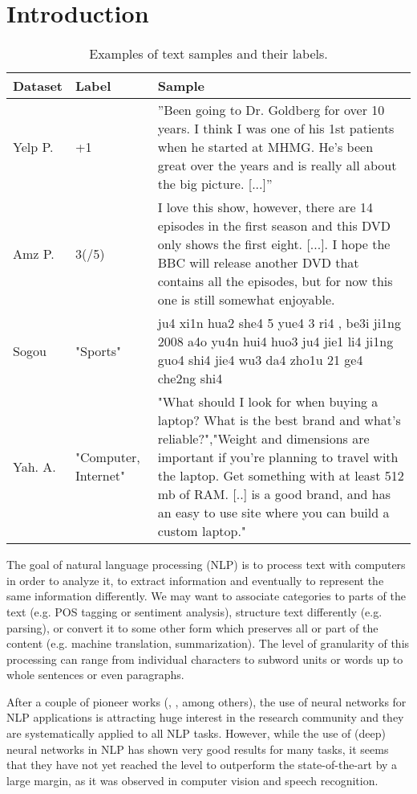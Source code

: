 \documentclass[a4paper,11pt]{article}
\newcommand{\eg}{e.g. }
\begin{document}
\section{Introduction}
\begin{table*}[!ht]
  \centering
  \begin{tabular}{|lp{1.4cm}p{12cm}|}
    \hline
    Dataset & Label & Sample  \\
    \hline
    Yelp P. & +1 & ”Been going to Dr. Goldberg for over 10 years. I think I was one of his 1st patients when he started at MHMG. He’s been great over the years and is really all about the big picture. [...]” \\
    \hline
    Amz P. & 3(/5) & I love this show, however, there are 14 episodes in the first season and this DVD only shows the first eight. [...]. I hope the BBC will release another DVD that contains all the episodes, but for now this one is still somewhat enjoyable.\\
    \hline
    Sogou & "Sports" & ju4 xi1n hua2 she4  5 yue4 3 ri4 , be3i ji1ng 2008 a4o yu4n hui4 huo3 ju4 jie1 li4 ji1ng guo4 shi4 jie4 wu3 da4 zho1u 21 ge4 che2ng shi4 \\ \hline
    Yah. A. & "Computer, Internet" & "What should I look for when buying a laptop? What is the best brand and what's reliable?","Weight and dimensions are important if you're planning to travel with the laptop. Get something with at least 512 mb of RAM. [..] is a good brand, and has an easy to use site where you can build a custom laptop."\\\hline
  \end{tabular}
    \caption{Examples of text samples and their labels.}
      \label{figresults}
\end{table*}
The goal of natural language processing (NLP) is to process text with
computers in order to analyze it, to extract information and eventually to
represent the same information differently.  We may want to associate
categories to parts of the text (\eg POS tagging or sentiment analysis),
structure text differently (\eg  parsing), or convert it to some other form
which preserves all or part of the content (\eg machine translation,
summarization).  The level of granularity of this processing can range from
individual characters to subword units \cite{sennrich2015neural} or words up to whole sentences or even paragraphs.

After a couple of pioneer works
(, , 
among others), the use of neural networks for NLP applications is 
attracting huge interest in the research community and they are 
systematically applied to all NLP tasks.  However, while the use of (deep)
neural networks in NLP has shown very good results for many tasks, it seems that
they have not yet reached the level to outperform the state-of-the-art by a
large margin, as it was observed in computer vision and speech recognition.
\end{document}
